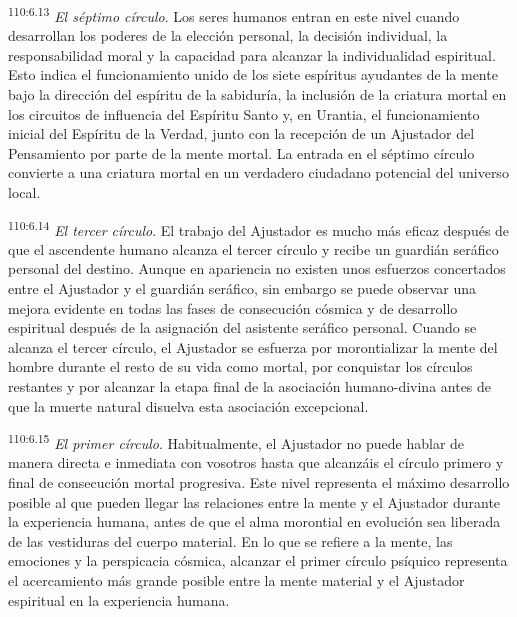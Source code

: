 \par
\textsuperscript{110:6.13} \textit{El séptimo círculo}. Los seres humanos entran en este nivel cuando desarrollan los poderes de la elección personal, la decisión individual, la responsabilidad moral y la capacidad para alcanzar la individualidad espiritual. Esto indica el funcionamiento unido de los siete espíritus ayudantes de la mente bajo la dirección del espíritu de la sabiduría, la inclusión de la criatura mortal en los circuitos de influencia del Espíritu Santo y, en Urantia, el funcionamiento inicial del Espíritu de la Verdad, junto con la recepción de un Ajustador del Pensamiento por parte de la mente mortal. La entrada en el séptimo círculo convierte a una criatura mortal en un verdadero ciudadano potencial del universo local.

\par
\textsuperscript{110:6.14} \textit{El tercer círculo}. El trabajo del Ajustador es mucho más eficaz después de que el ascendente humano alcanza el tercer círculo y recibe un guardián seráfico personal del destino. Aunque en apariencia no existen unos esfuerzos concertados entre el Ajustador y el guardián seráfico, sin embargo se puede observar una mejora evidente en todas las fases de consecución cósmica y de desarrollo espiritual después de la asignación del asistente seráfico personal. Cuando se alcanza el tercer círculo, el Ajustador se esfuerza por morontializar la mente del hombre durante el resto de su vida como mortal, por conquistar los círculos restantes y por alcanzar la etapa final de la asociación humano-divina antes de que la muerte natural disuelva esta asociación excepcional.

\par
\textsuperscript{110:6.15} \textit{El primer círculo}. Habitualmente, el Ajustador no puede hablar de manera directa e inmediata con vosotros hasta que alcanzáis el círculo primero y final de consecución mortal progresiva. Este nivel representa el máximo desarrollo posible al que pueden llegar las relaciones entre la mente y el Ajustador durante la experiencia humana, antes de que el alma morontial en evolución sea liberada de las vestiduras del cuerpo material. En lo que se refiere a la mente, las emociones y la perspicacia cósmica, alcanzar el primer círculo psíquico representa el acercamiento más grande posible entre la mente material y el Ajustador espiritual en la experiencia humana.

